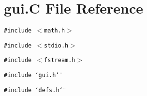 \section{gui.C File Reference}
\label{gui_C}
{\tt \#include $<$math.h$>$}\par
{\tt \#include $<$stdio.h$>$}\par
{\tt \#include $<$fstream.h$>$}\par
{\tt \#include \char`\"{}gui.h\char`\"{}}\par
{\tt \#include \char`\"{}defs.h\char`\"{}}\par
